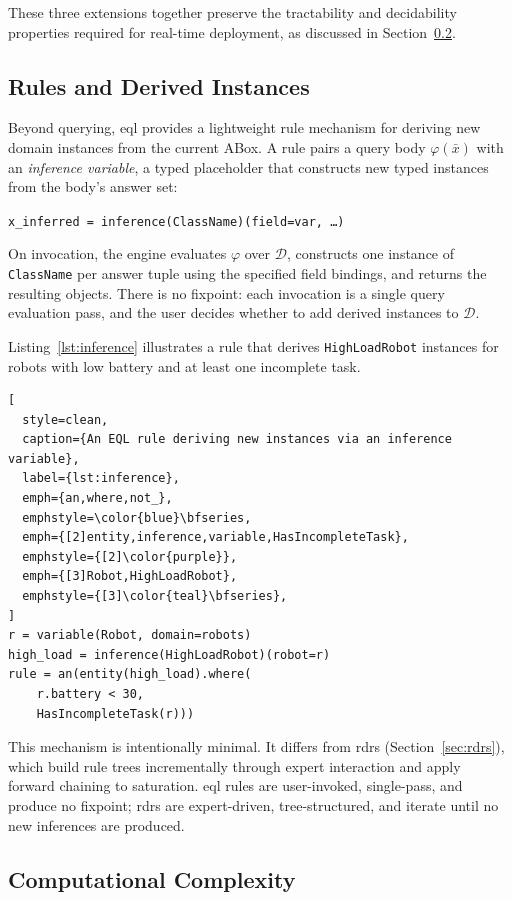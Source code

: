 \documentclass{article}
\begin{document}
These three extensions together preserve the tractability and decidability
properties required for real-time deployment, as discussed in
Section~\ref{ssec:eql_complexity}.


\subsection{Rules and Derived Instances}
\label{ssec:eql_rules}

Beyond querying, \ac{eql} provides a lightweight rule mechanism for deriving
new domain instances from the current ABox. A rule pairs a query body
$\varphi(\bar{x})$ with an \emph{inference variable}, a typed placeholder
that constructs new typed instances from the body's answer set:
%
\begin{center}
  \texttt{x\_inferred = inference(ClassName)(field=var, \ldots)}
\end{center}
%
On invocation, the engine evaluates $\varphi$ over $\mathcal{D}$, constructs
one instance of \texttt{ClassName} per answer tuple using the specified field
bindings, and returns the resulting objects. There is no fixpoint: each
invocation is a single query evaluation pass, and the user decides whether to
add derived instances to $\mathcal{D}$.

Listing~\ref{lst:inference} illustrates a rule that derives
\texttt{HighLoadRobot} instances for robots with low battery and at least one
incomplete task.

\begin{lstlisting}[
  style=clean,
  caption={An EQL rule deriving new instances via an inference variable},
  label={lst:inference},
  emph={an,where,not_},
  emphstyle=\color{blue}\bfseries,
  emph={[2]entity,inference,variable,HasIncompleteTask},
  emphstyle={[2]\color{purple}},
  emph={[3]Robot,HighLoadRobot},
  emphstyle={[3]\color{teal}\bfseries},
]
r = variable(Robot, domain=robots)
high_load = inference(HighLoadRobot)(robot=r)
rule = an(entity(high_load).where(
    r.battery < 30,
    HasIncompleteTask(r)))
\end{lstlisting}

This mechanism is intentionally minimal. It differs from \acp{rdr}
(Section~\ref{sec:rdrs}), which build rule trees incrementally through expert
interaction and apply forward chaining to saturation. \ac{eql} rules are
user-invoked, single-pass, and produce no fixpoint; \acp{rdr} are expert-driven,
tree-structured, and iterate until no new inferences are produced.


\subsection{Computational Complexity}
\label{ssec:eql_complexity}
\end{document}
